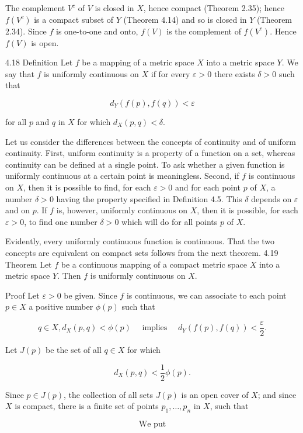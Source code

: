 \documentclass[10pt]{article}
\begin{document}
The complement $V^{c}$ of $V$ is closed in $X$, hence compact (Theorem 2.35); hence $f\left(V^{c}\right)$ is a compact subset of $Y$ (Theorem 4.14) and so is closed in $Y$ (Theorem 2.34). Since $f$ is one-to-one and onto, $f(V)$ is the complement of $f\left(V^{c}\right)$. Hence $f(V)$ is open.

4.18 Definition Let $f$ be a mapping of a metric space $X$ into a metric space $Y$. We say that $f$ is uniformly continuous on $X$ if for every $\varepsilon>0$ there exists $\delta>0$ such that

$$
d_{Y}(f(p), f(q))<\varepsilon
$$

for all $p$ and $q$ in $X$ for which $d_{X}(p, q)<\delta$.

Let us consider the differences between the concepts of continuity and of uniform continuity. First, uniform continuity is a property of a function on a set, whereas continuity can be defined at a single point. To ask whether a given function is uniformly continuous at a certain point is meaningless. Second, if $f$ is continuous on $X$, then it is possible to find, for each $\varepsilon>0$ and for each point $p$ of $X$, a number $\delta>0$ having the property specified in Definition 4.5. This $\delta$ depends on $\varepsilon$ and on $p$. If $f$ is, however, uniformly continuous on $X$, then it is possible, for each $\varepsilon>0$, to find one number $\delta>0$ which will do for all points $p$ of $X$.

Evidently, every uniformly continuous function is continuous. That the two concepts are equivalent on compact sets follows from the next theorem. 4.19 Theorem Let $f$ be a continuous mapping of a compact metric space $X$ into a metric space $Y$. Then $f$ is uniformly continuous on $X$.

Proof Let $\varepsilon>0$ be given. Since $f$ is continuous, we can associate to each point $p \in X$ a positive number $\phi(p)$ such that

$$
q \in X, d_{X}(p, q)<\phi(p) \quad \text { implies } \quad d_{Y}(f(p), f(q))<\frac{\varepsilon}{2} .
$$

Let $J(p)$ be the set of all $q \in X$ for which

$$
d_{X}(p, q)<\frac{1}{2} \phi(p) .
$$

Since $p \in J(p)$, the collection of all sets $J(p)$ is an open cover of $X$; and since $X$ is compact, there is a finite set of points $p_{1}, \ldots, p_{n}$ in $X$, such that

$$
\text { We put }
$$
\end{document}
